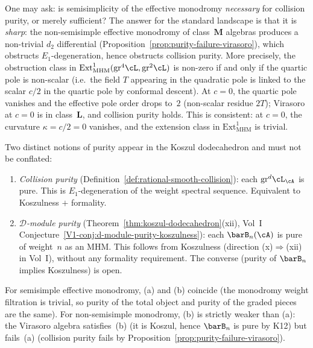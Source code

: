 \begin{remark}
\smallskip
One may ask: is semisimplicity of the effective monodromy
\emph{necessary} for collision purity, or merely sufficient? The
answer for the standard landscape is that it is \emph{sharp}: the
non-semisimple effective monodromy of class~$\mathbf{M}$ algebras
produces a non-trivial $d_2$ differential
(Proposition~\ref{prop:purity-failure-virasoro}), which obstructs
$E_1$-degeneration, hence obstructs collision purity. More
precisely, the obstruction class in
$\mathrm{Ext}^1_{\mathrm{MHM}}(\mathrm{gr}^4\cL, \mathrm{gr}^2\cL)$
is non-zero if and only if the quartic pole is non-scalar
(i.e.\ the field $T$ appearing in the quadratic pole is linked to
the scalar $c/2$ in the quartic pole by conformal descent). At
$c = 0$, the quartic pole vanishes and the effective pole order drops
to~$2$ (non-scalar residue $2T$); Virasoro at $c = 0$ is in
class~$\mathbf{L}$, and collision purity holds. This is consistent:
at $c = 0$, the curvature $\kappa = c/2 = 0$ vanishes, and the
extension class in $\mathrm{Ext}^1_{\mathrm{MHM}}$ is trivial.

\smallskip
Two distinct notions of purity appear in the Koszul dodecahedron
and must not be conflated:
\begin{enumerate}[label=\textup{(\alph*)}]
\item \emph{Collision purity}
 (Definition~\ref{def:rational-smooth-collision}): each
 $\mathrm{gr}^d\cL_\cA$ is pure. This is $E_1$-degeneration
 of the weight spectral sequence. Equivalent to Koszulness
 $+$ formality.
\item \emph{$\mathcal{D}$-module purity}
 (Theorem~\ref{thm:koszul-dodecahedron}(xii), Vol~I
 Conjecture~\ref*{V1-conj:d-module-purity-koszulness}):
 each $\barB_n(\cA)$ is pure of weight~$n$ as an MHM. This
 follows from Koszulness (direction (x)$\Rightarrow$(xii)
 in Vol~I), without any formality requirement. The converse
 (purity of $\barB_n$ implies Koszulness) is open.
\end{enumerate}
For semisimple effective monodromy, (a) and (b) coincide
(the monodromy weight filtration is trivial, so purity of the
total object and purity of the graded pieces are the same).
For non-semisimple monodromy, (b) is strictly weaker than (a):
the Virasoro algebra satisfies~(b) (it is Koszul, hence
$\barB_n$ is pure by K12) but fails~(a) (collision purity fails
by Proposition~\ref{prop:purity-failure-virasoro}).
\end{remark}

